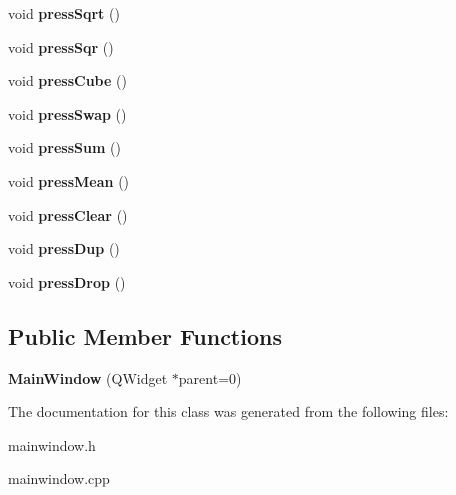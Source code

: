 \begin{DoxyCompactItemize}
\item 
\hypertarget{class_main_window_a1cef6e994e88446eae146ec920588c36}{void {\bfseries press\-Sqrt} ()}\label{class_main_window_a1cef6e994e88446eae146ec920588c36}

\item 
\hypertarget{class_main_window_adcb82f0557536c9d074bcc049c9dec83}{void {\bfseries press\-Sqr} ()}\label{class_main_window_adcb82f0557536c9d074bcc049c9dec83}

\item 
\hypertarget{class_main_window_af818545c8ce818a11ce17c26ad9ed273}{void {\bfseries press\-Cube} ()}\label{class_main_window_af818545c8ce818a11ce17c26ad9ed273}

\item 
\hypertarget{class_main_window_a90f55dff8cd88ebb9ca51fbb45ff9572}{void {\bfseries press\-Swap} ()}\label{class_main_window_a90f55dff8cd88ebb9ca51fbb45ff9572}

\item 
\hypertarget{class_main_window_af8d41c17cf9ac3326d78792b4016648a}{void {\bfseries press\-Sum} ()}\label{class_main_window_af8d41c17cf9ac3326d78792b4016648a}

\item 
\hypertarget{class_main_window_a31a44d6c9060625aef1cb4f360d1c9b9}{void {\bfseries press\-Mean} ()}\label{class_main_window_a31a44d6c9060625aef1cb4f360d1c9b9}

\item 
\hypertarget{class_main_window_a7bfe416d75e010b19a746534be888500}{void {\bfseries press\-Clear} ()}\label{class_main_window_a7bfe416d75e010b19a746534be888500}

\item 
\hypertarget{class_main_window_a85c203aa98a11bff2fc1c04850c487f5}{void {\bfseries press\-Dup} ()}\label{class_main_window_a85c203aa98a11bff2fc1c04850c487f5}

\item 
\hypertarget{class_main_window_a7bf431a5544caa9134f78acaf4f5be96}{void {\bfseries press\-Drop} ()}\label{class_main_window_a7bf431a5544caa9134f78acaf4f5be96}

\end{DoxyCompactItemize}
\subsection*{Public Member Functions}
\begin{DoxyCompactItemize}
\item 
\hypertarget{class_main_window_a8b244be8b7b7db1b08de2a2acb9409db}{{\bfseries Main\-Window} (Q\-Widget $\ast$parent=0)}\label{class_main_window_a8b244be8b7b7db1b08de2a2acb9409db}

\end{DoxyCompactItemize}


The documentation for this class was generated from the following files\-:\begin{DoxyCompactItemize}
\item 
mainwindow.\-h\item 
mainwindow.\-cpp\end{DoxyCompactItemize}

